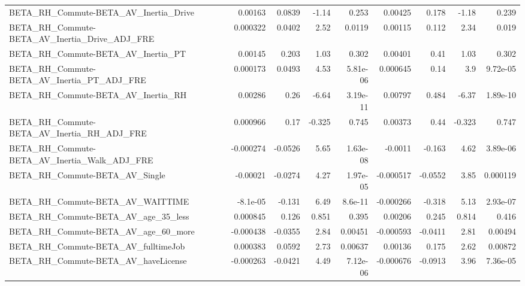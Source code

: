 \begin{tabular}{lrrrrrrrr}
BETA\_RH\_Commute-BETA\_AV\_Inertia\_Drive              &     0.00163 &       0.0839 &    -1.14 &    0.253 &    0.00425 &       0.178 &        -1.18 &         0.239 \\
BETA\_RH\_Commute-BETA\_AV\_Inertia\_Drive\_ADJ\_FRE      &    0.000322 &       0.0402 &     2.52 &   0.0119 &    0.00115 &       0.112 &         2.34 &         0.019 \\
BETA\_RH\_Commute-BETA\_AV\_Inertia\_PT                 &     0.00145 &        0.203 &     1.03 &    0.302 &    0.00401 &        0.41 &         1.03 &         0.302 \\
BETA\_RH\_Commute-BETA\_AV\_Inertia\_PT\_ADJ\_FRE         &    0.000173 &       0.0493 &     4.53 & 5.81e-06 &   0.000645 &        0.14 &          3.9 &      9.72e-05 \\
BETA\_RH\_Commute-BETA\_AV\_Inertia\_RH                 &     0.00286 &         0.26 &    -6.64 & 3.19e-11 &    0.00797 &       0.484 &        -6.37 &      1.89e-10 \\
BETA\_RH\_Commute-BETA\_AV\_Inertia\_RH\_ADJ\_FRE         &    0.000966 &         0.17 &   -0.325 &    0.745 &    0.00373 &        0.44 &       -0.323 &         0.747 \\
BETA\_RH\_Commute-BETA\_AV\_Inertia\_Walk\_ADJ\_FRE       &   -0.000274 &      -0.0526 &     5.65 & 1.63e-08 &    -0.0011 &      -0.163 &         4.62 &      3.89e-06 \\
BETA\_RH\_Commute-BETA\_AV\_Single                     &    -0.00021 &      -0.0274 &     4.27 & 1.97e-05 &  -0.000517 &     -0.0552 &         3.85 &      0.000119 \\
BETA\_RH\_Commute-BETA\_AV\_WAITTIME                   &    -8.1e-05 &       -0.131 &     6.49 &  8.6e-11 &  -0.000266 &      -0.318 &         5.13 &      2.93e-07 \\
BETA\_RH\_Commute-BETA\_AV\_age\_35\_less                &    0.000845 &        0.126 &    0.851 &    0.395 &    0.00206 &       0.245 &        0.814 &         0.416 \\
BETA\_RH\_Commute-BETA\_AV\_age\_60\_more                &   -0.000438 &      -0.0355 &     2.84 &  0.00451 &  -0.000593 &     -0.0411 &         2.81 &       0.00494 \\
BETA\_RH\_Commute-BETA\_AV\_fulltimeJob                &    0.000383 &       0.0592 &     2.73 &  0.00637 &    0.00136 &       0.175 &         2.62 &       0.00872 \\
BETA\_RH\_Commute-BETA\_AV\_haveLicense                &   -0.000263 &      -0.0421 &     4.49 & 7.12e-06 &  -0.000676 &     -0.0913 &         3.96 &      7.36e-05 \\

\end{tabular}

